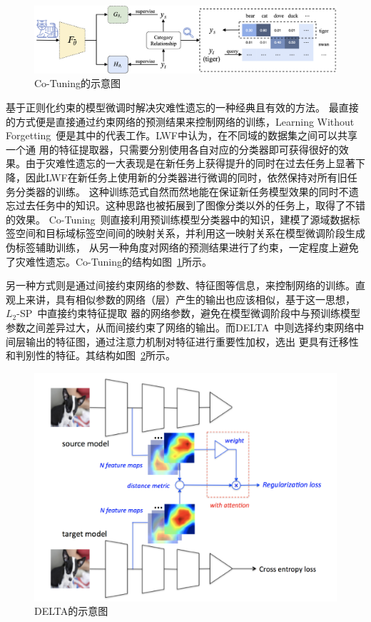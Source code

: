 \begin{figure}
    \centering
    \includegraphics[width=\linewidth]{figures/cotuning.png}
    \caption{Co-Tuning的示意图~\citep{you2020co}}
    \label{fig:cotuning}
\end{figure}

基于正则化约束的模型微调时解决灾难性遗忘的一种经典且有效的方法。
最直接的方式便是直接通过约束网络的预测结果来控制网络的训练，Learning Without Forgetting~\citep{li2017learning}便是其中的代表工作。LWF中认为，在不同域的数据集之间可以共享一个通
用的特征提取器，只需要分别使用各自对应的分类器即可获得很好的效果。由于灾难性遗忘的一大表现是在新任务上获得提升的同时在过去任务上显著下降，因此LWF在新任务上使用新的分类器进行微调的同时，依然保持对所有旧任务分类器的训练。
这种训练范式自然而然地能在保证新任务模型效果的同时不遗忘过去任务中的知识。这种思路也被拓展到了图像分类以外的任务上，取得了不错的效果。
Co-Tuning~\citep{you2020co}则直接利用预训练模型分类器中的知识，建模了源域数据标签空间和目标域标签空间间的映射关系，并利用这一映射关系在模型微调阶段生成伪标签辅助训练，
从另一种角度对网络的预测结果进行了约束，一定程度上避免了灾难性遗忘。Co-Tuning的结构如图~\ref{fig:cotuning}所示。

另一种方式则是通过间接约束网络的参数、特征图等信息，来控制网络的训练。直观上来讲，具有相似参数的网络（层）产生的输出也应该相似，基于这一思想，$L_2$-SP~\citep{xuhong2018explicit}中直接约束特征提取
器的网络参数，避免在模型微调阶段中与预训练模型参数之间差异过大，从而间接约束了网络的输出。而DELTA~\citep{li2018delta}中则选择约束网络中间层输出的特征图，通过注意力机制对特征进行重要性加权，选出
更具有迁移性和判别性的特征。其结构如图~\ref{fig:delta}所示。

\begin{figure}
    \centering
    \includegraphics[width=0.8\linewidth]{figures/delta.png}
    \caption{DELTA的示意图~\citep{li2018delta}}
    \label{fig:delta}
\end{figure}

